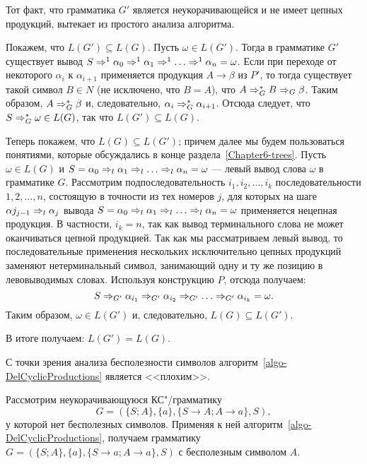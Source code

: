 \begin{myproof}
Тот факт, что грамматика $G'$ является неукорачивающейся и не имеет цепных продукций, вытекает из простого анализа алгоритма.

Покажем, что $L(G')\subseteq L(G)$. Пусть $\omega\in L(G')$. Тогда в грамматике $G'$ существует вывод $S\Rightarrow^1\alpha_0 \Rightarrow^1 \alpha_1 \Rightarrow^1 \ldots \Rightarrow^1 \alpha_n = \omega$. Если при переходе от некоторого $\alpha_i$ к $\alpha_{i+1}$ применяется продукция $A\to\beta$ из $P'$, то тогда существует такой символ $B\in N$ (не исключено, что $B=A$), что $A\Rightarrow_G^*B\Rightarrow_G\beta$. Таким образом, $A\Rightarrow_G^*\beta$ и, следовательно, $\alpha_i\Rightarrow_G^*\alpha_{i+1}$. Отсюда следует, что $S\Rightarrow_G^*\omega\in L(G)$, так что $L(G')\subseteq L(G)$.

Теперь покажем, что $L(G)\subseteq L(G')$; причем далее мы будем пользоваться понятиями, которые обсуждались в конце раздела~\ref{Chapter6-trees}. Пусть $\omega\in L(G)$ и $S=\alpha_0\Rightarrow_l\alpha_1\Rightarrow_l\ldots\Rightarrow_l\alpha_n=\omega$ --- левый вывод слова $\omega$ в грамматике $G$. Рассмотрим подпоследовательность $i_1, i_2, \ldots , i_k$ последовательности $1, 2, \ldots , n$, состоящую в точности из тех номеров $j$, для которых на шаге $\alpha j_{j-1}\Rightarrow_l\alpha_j$ вывода $S=\alpha_0\Rightarrow_l\alpha_1\Rightarrow_l\ldots\Rightarrow_l\alpha_n=\omega$ применяется нецепная продукция. В частности, $i_k=n$, так как вывод терминального слова не может оканчиваться цепной продукцией. Так как мы рассматриваем левый вывод, то последовательные применения нескольких исключительно цепных продукций заменяют нетерминальный символ, занимающий одну и ту же позицию в левовыводимых словах. Используя конструкцию $P$, отсюда получаем:
\[
S\Rightarrow_{G'}\alpha_{i_1}\Rightarrow_{G'}\alpha_{i_2}\Rightarrow_{G'}\ldots \Rightarrow_{G'} \alpha_{i_k}=\omega.
\]
Таким образом, $\omega\in L(G')$ и, следовательно, $L(G)\subseteq L(G')$.

В итоге получаем: $L(G')=L(G)$.
\end{myproof}

С точки зрения анализа бесполезности символов алгоритм~\ref{algo-DelCyclicProductions}
является <<плохим>>.

\begin{myexample}
Рассмотрим неукорачивающуюся КС"/грамматику 
\[G=(\{S;A\},\{a\},\{S\to A;A\to a\},S),\]
у которой нет бесполезных символов. Применяя к ней алгоритм~\ref{algo-DelCyclicProductions}, получаем грамматику $G=(\{S;A\},\{a\},\{S\to a;A\to a\},S)$ с бесполезным символом $A$.
\end{myexample}

